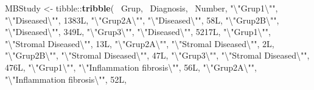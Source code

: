 \documentclass[
]{article}
\newenvironment{Shaded}{\begin{snugshade}}{\end{snugshade}}
\newcommand{\CharTok}[1]{\textcolor[rgb]{0.57,0.30,0.62}{#1}}
\newcommand{\KeywordTok}[1]{\textcolor[rgb]{0.12,0.11,0.11}{\textbf{#1}}}
\newcommand{\NormalTok}[1]{\textcolor[rgb]{0.12,0.11,0.11}{#1}}
\newcommand{\OperatorTok}[1]{\textcolor[rgb]{0.12,0.11,0.11}{#1}}
\newcommand{\StringTok}[1]{\textcolor[rgb]{0.75,0.01,0.01}{#1}}
\begin{document}
\begin{Shaded}
\begin{Highlighting}[]
{{{{{{{{{{{{{{{{{{{{{{{{{{{{{{{{{{{{{{{{{{{{{{{{{{{{{{{{{{{{{{{{{{{{{{{{{{{{{{{{{{{{{{{{{{{{{{{{{{{{{{{{{{{{{{{{{{{{{{{{{{{{{{{{{{{{{{{{{{{{{{{{{{{{{{{{{{{{{{{{{{{{{{{{{{{{{{{{{{{{{{{{{{{{{{{{{{{{{{{{{{{{{{{{{{{{{{{{{{{{\NormalTok{MBStudy <-}\StringTok{ }
\StringTok{  }\NormalTok{tibble}\OperatorTok{::}\KeywordTok{tribble}\NormalTok{(}
    \OperatorTok{~}\NormalTok{Grup,                           }\OperatorTok{~}\NormalTok{Diagnosis,   }\OperatorTok{~}\NormalTok{Number,}
    \StringTok{"}\CharTok{\textbackslash{}"}\StringTok{Grup1}\CharTok{\textbackslash{}"}\StringTok{"}\NormalTok{,           }\StringTok{"}\CharTok{\textbackslash{}"}\StringTok{Diseased}\CharTok{\textbackslash{}"}\StringTok{"}\NormalTok{, 1383L,}
    \StringTok{"}\CharTok{\textbackslash{}"}\StringTok{Grup2A}\CharTok{\textbackslash{}"}\StringTok{"}\NormalTok{,           }\StringTok{"}\CharTok{\textbackslash{}"}\StringTok{Diseased}\CharTok{\textbackslash{}"}\StringTok{"}\NormalTok{,   58L,}
    \StringTok{"}\CharTok{\textbackslash{}"}\StringTok{Grup2B}\CharTok{\textbackslash{}"}\StringTok{"}\NormalTok{,           }\StringTok{"}\CharTok{\textbackslash{}"}\StringTok{Diseased}\CharTok{\textbackslash{}"}\StringTok{"}\NormalTok{,  349L,}
    \StringTok{"}\CharTok{\textbackslash{}"}\StringTok{Grup3}\CharTok{\textbackslash{}"}\StringTok{"}\NormalTok{,           }\StringTok{"}\CharTok{\textbackslash{}"}\StringTok{Diseased}\CharTok{\textbackslash{}"}\StringTok{"}\NormalTok{, 5217L,}
    \StringTok{"}\CharTok{\textbackslash{}"}\StringTok{Grup1}\CharTok{\textbackslash{}"}\StringTok{"}\NormalTok{, }\StringTok{"}\CharTok{\textbackslash{}"}\StringTok{Stromal   Diseased}\CharTok{\textbackslash{}"}\StringTok{"}\NormalTok{,   13L,}
    \StringTok{"}\CharTok{\textbackslash{}"}\StringTok{Grup2A}\CharTok{\textbackslash{}"}\StringTok{"}\NormalTok{, }\StringTok{"}\CharTok{\textbackslash{}"}\StringTok{Stromal   Diseased}\CharTok{\textbackslash{}"}\StringTok{"}\NormalTok{,    2L,}
    \StringTok{"}\CharTok{\textbackslash{}"}\StringTok{Grup2B}\CharTok{\textbackslash{}"}\StringTok{"}\NormalTok{, }\StringTok{"}\CharTok{\textbackslash{}"}\StringTok{Stromal   Diseased}\CharTok{\textbackslash{}"}\StringTok{"}\NormalTok{,   47L,}
    \StringTok{"}\CharTok{\textbackslash{}"}\StringTok{Grup3}\CharTok{\textbackslash{}"}\StringTok{"}\NormalTok{, }\StringTok{"}\CharTok{\textbackslash{}"}\StringTok{Stromal   Diseased}\CharTok{\textbackslash{}"}\StringTok{"}\NormalTok{,  476L,}
    \StringTok{"}\CharTok{\textbackslash{}"}\StringTok{Grup1}\CharTok{\textbackslash{}"}\StringTok{"}\NormalTok{,   }\StringTok{"}\CharTok{\textbackslash{}"}\StringTok{Inflammation fibrosis}\CharTok{\textbackslash{}"}\StringTok{"}\NormalTok{,   56L,}
    \StringTok{"}\CharTok{\textbackslash{}"}\StringTok{Grup2A}\CharTok{\textbackslash{}"}\StringTok{"}\NormalTok{,   }\StringTok{"}\CharTok{\textbackslash{}"}\StringTok{Inflammation fibrosis}\CharTok{\textbackslash{}"}\StringTok{"}\NormalTok{,   52L,}
}}}}}}}}}}}}}}}}}}}}}}}}}}}}}}}}}}}}}}}}}}}}}}}}}}}}}}}}}}}}}}}}}}}}}}}}}}}}}}}}}}}}}}}}}}}}}}}}}}}}}}}}}}}}}}}}}}}}}}}}}}}}}}}}}}}}}}}}}}}}}}}}}}}}}}}}}}}}}}}}}}}}}}}}}}}}}}}}}}}}}}}}}}}}}}}}}}}}}}}}}}}}}}}}}}}}}}}}}}}}
\end{Highlighting}
\end{Shaded}
\end{document}
